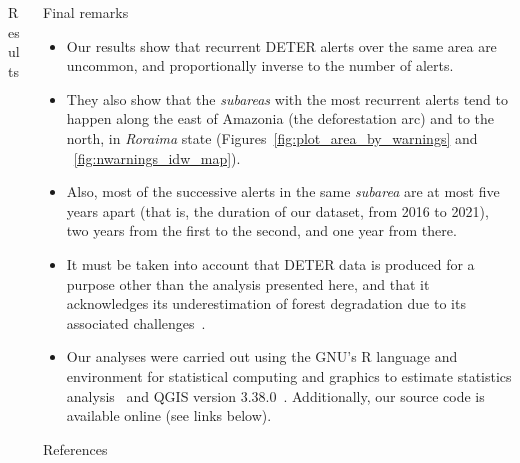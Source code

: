 \documentclass[20pt]{beamer}
\begin{document}
\begin{frame}[fragile,t]
\begin{columns}[t]
\begin{column}{0.33\linewidth}
\begin{block}{Results\vphantom{g}}
    \end{block}
\end{column}




\begin{column}{0.33\linewidth}

\vspace{0.5cm}

    \begin{block}{Final remarks\vphantom{g}}
        \begin{itemize}
            \item Our results show that recurrent DETER alerts over the same area are uncommon, and proportionally inverse to the number of alerts.
            \item They also show that the \textit{subareas} with the most recurrent alerts tend to happen along the east of Amazonia (the deforestation arc) and to the north, in \textit{Roraima} state (Figures~\ref{fig:plot_area_by_warnings} and ~\ref{fig:nwarnings_idw_map}).
            \item Also, most of the successive alerts in the same \textit{subarea} are at most five years apart (that is, the duration of our dataset, from 2016 to 2021), two years from the first to the second, and one year from there. 
            \item It must be taken into account that DETER data is produced for a purpose other than the analysis presented here, and that it acknowledges its underestimation of forest degradation due to its associated challenges~\cite{dealmeida2022}.
            \item Our analyses were carried out using the GNU's R language and environment for statistical computing and graphics to estimate statistics analysis~\cite{ihaka1996} and QGIS version 3.38.0~\cite{QGIS_software}. Additionally, our source code is available online (see links below).
        \end{itemize}
    \end{block}

\vspace{1cm}

    \begin{block}{References\vphantom{g}}
        {\small


        }
    \end{block}

\vspace{0.5cm}


\end{column}
\end{columns}
\end{frame}
\end{document}
